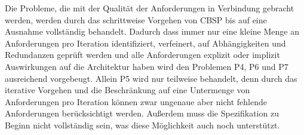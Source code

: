 Die Probleme, die mit der Qualit\"at der Anforderungen in Verbindung gebracht werden, werden durch das schrittweise Vorgehen von CBSP bis auf eine Ausnahme vollst\"andig behandelt. Dadurch dass immer nur eine kleine Menge an Anforderungen pro Iteration identifiziert, verfeinert, auf Abh\"angigkeiten und Redundanzen gepr\"uft werden und alle Anforderungen explizit oder implizit Auswirkungen auf die Architektur haben wird den Problemen P4, P6 und P7 ausreichend vorgebeugt. Allein P5 wird nur teilweise behandelt, denn durch das iterative Vorgehen und die Beschr\"ankung auf eine Untermenge von Anforderungen pro Iteration k\"onnen zwar ungenaue aber nicht fehlende Anforderungen ber\"ucksichtigt werden. Au\ss{}erdem muss die Spezifikation zu Beginn nicht vollst\"andig sein, was diese M\"oglichkeit auch noch unterst\"utzt. \\


%
